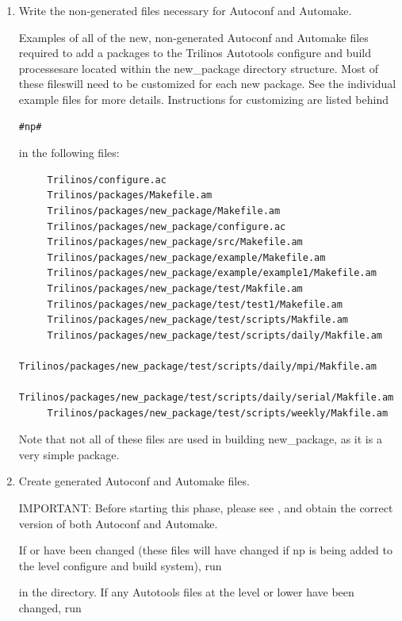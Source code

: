\documentclass[12pt,relax]{TrilinosDevGuide}
\begin{document}
\begin{enumerate}

\item Write the non-generated files necessary for Autoconf and Automake.

Examples of all of the new, non-generated Autoconf and Automake files
required to add a packages to the Trilinos Autotools configure and build 
processesare located within the new\_package directory structure.  Most of 
these fileswill need to be customized for each new package.  See the 
individual example files for more details.  Instructions for customizing are 
listed behind 
\begin{verbatim}
#np# 
\end{verbatim}
in the following files:
\begin{verbatim}
     Trilinos/configure.ac
     Trilinos/packages/Makefile.am
     Trilinos/packages/new_package/Makefile.am
     Trilinos/packages/new_package/configure.ac  
     Trilinos/packages/new_package/src/Makefile.am
     Trilinos/packages/new_package/example/Makefile.am
     Trilinos/packages/new_package/example/example1/Makefile.am
     Trilinos/packages/new_package/test/Makfile.am
     Trilinos/packages/new_package/test/test1/Makefile.am
     Trilinos/packages/new_package/test/scripts/Makfile.am
     Trilinos/packages/new_package/test/scripts/daily/Makfile.am
     Trilinos/packages/new_package/test/scripts/daily/mpi/Makfile.am
     Trilinos/packages/new_package/test/scripts/daily/serial/Makfile.am
     Trilinos/packages/new_package/test/scripts/weekly/Makfile.am
\end{verbatim}

Note that not all of these files are used in building new\_package, as it is 
a very simple package.

\item Create generated Autoconf and Automake files.

IMPORTANT: Before starting this phase, please see 
, and obtain the correct 
version of both Autoconf and Automake.

If  or 
 have been changed (these files 
will have changed if np is being added to the  level 
configure and build system), run 


in the  directory.  If any Autotools files at the 
 level or lower have been changed, run 


\end{enumerate}
\end{document}
